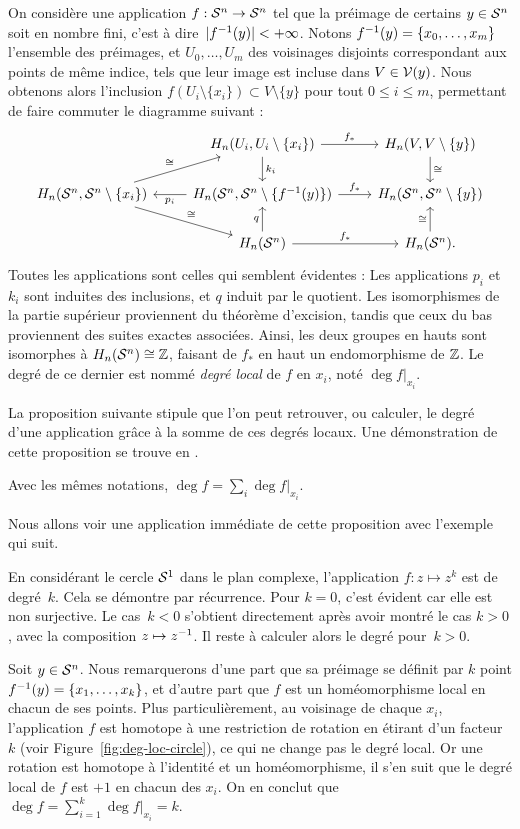 On considère une application $f:\mathcal{S}^{n}\to \mathcal{S}^{n}$ tel que la préimage de certains $y\in\mathcal{S}^{n}$ soit en nombre fini, c'est à dire~$|f^{-1}(y)|<+\infty$. Notons $f^{-1}(y)=\{x_0,\ldots,x_m\} $ l'ensemble des préimages, et $U_0,\ldots,U_m$ des voisinages disjoints correspondant aux points de même indice, tels que leur image est incluse dans $V\in\mathcal{V}(y)$. Nous obtenons alors l'inclusion $f(U_i\setminus\{x_i\})\subset V\setminus\{y\}$ pour tout $0\leq i\leq m$, permettant de faire commuter le diagramme suivant  :\[\begin{tikzcd}
&H_n(U_i,U_i\setminus\{x_i\})\arrow[r,"f_\ast"]\arrow[d,"k_i"]&H_n(V,V\setminus\{y\})\arrow[d,"\cong"]\\
H_n(\s{n},\s{n}\setminus\{x_i\})\arrow[ur, "\cong"]\arrow[dr,"\cong"]&H_n(\s{n},\s{n}\setminus\{f\inv(y)\})\arrow[l,"p_i"]\arrow[r,"f_\ast"]&H_n(\s{n},\s{n}\setminus\{y\})\\
&H_n(\s{n})\arrow[u,"q"]\arrow[r,"f_\ast"]&H_n(\s{n}).\arrow[u,"\cong"]
\end{tikzcd}\]Toutes les applications sont celles qui semblent évidentes : Les applications $p_i$ et $k_i$ sont induites des inclusions, et $q$ induit par le quotient. Les isomorphismes de la partie supérieur proviennent du théorème d'excision, tandis que ceux du bas proviennent des suites exactes associées. Ainsi, les deux groupes en hauts sont isomorphes à $H_n(\mathcal{S}^{n})\cong \mathbb{Z}$, faisant de $f_\ast$ en haut un endomorphisme de $\mathbb{Z}$. Le degré de ce dernier est nommé \emph{degré local} de $f$ en $x_i$, noté $\deg f|_{x_i}$. 

La proposition suivante stipule que l'on peut retrouver, ou calculer, le degré d'une application grâce à la somme de ces degrés locaux. Une démonstration de cette proposition se trouve en \cite[][Prop.~2.30]{Hatcher}.

\begin{proposition}
Avec les mêmes notations, $\deg f=\sum_i\deg f|_{x_i}$.
\end{proposition}

Nous allons voir une application immédiate de cette proposition avec l'exemple qui suit.

\begin{exemple}
En considérant le cercle $\mathcal{S}^{1}$ dans le plan complexe, l'application $f:z\mapsto z^k$ est de degré~$k$. Cela se démontre par récurrence. Pour $k=0$, c'est évident car elle est non surjective. Le cas~$k<0$ s'obtient directement après avoir montré le cas $k>0$, avec la composition $z\mapsto z^{-1}$. Il reste à calculer alors le degré pour~$k>0$.

Soit $y\in\mathcal{S}^{n}$. Nous remarquerons d'une part que sa préimage se définit par $k$ point $f^{-1}(y)=\{x_1,\ldots,x_k\}$, et d'autre part que $f$ est un homéomorphisme local en chacun de ses points. Plus particulièrement, au voisinage de chaque $x_i$, l'application $f$ est homotope à une restriction de rotation en étirant d'un facteur $k$ (voir Figure~\ref{fig:deg-loc-circle}), ce qui ne change pas le degré local. Or une rotation est homotope à l'identité et un homéomorphisme, il s'en suit que le degré local de $f$ est $+1$ en chacun des $x_i$. On en conclut que $\deg f=\sum_{i=1}^k\deg f|_{x_i}=k$.
\end{exemple}

